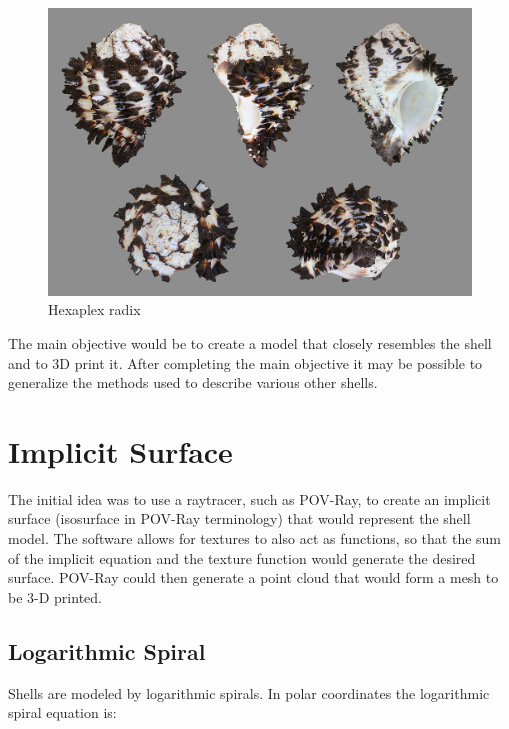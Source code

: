 \documentclass[a4paper]{article}
\begin{document}
\begin{figure}[h]
	\centering\includegraphics[scale=0.25]{./img/hexaplex_radix.jpg}
	\caption{Hexaplex radix \cite{wikipedia-hexaplex}}
	\label{fig:hexaplex-radix} %
\end{figure}

The main objective would be to create a model that closely resembles the shell and to 3D print it. After completing the main objective it may be possible to generalize the methods used to describe various other shells.

\section{Implicit Surface}

The initial idea was to use a raytracer, such as POV-Ray, to create an implicit surface (isosurface in POV-Ray terminology) that would represent the shell model. The software allows for textures to also act as functions, so that the sum of the implicit equation and the texture function would generate the desired surface. POV-Ray could then generate a point cloud that would form a mesh to be 3-D printed.

\subsection{Logarithmic Spiral}

Shells are modeled by logarithmic spirals. In polar coordinates the logarithmic spiral equation is:
\end{document}
